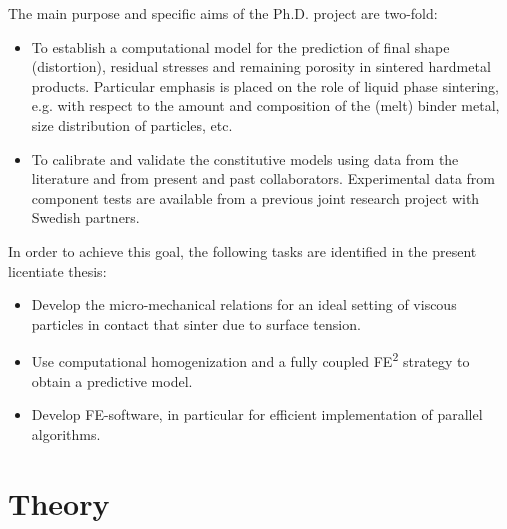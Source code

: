 \documentclass[ExampleMasters.tex]{subfiles}
\begin{document}
The main purpose and specific aims of the Ph.D. project are two-fold:
\begin{itemize}
\item To establish a computational model for the prediction of final shape (distortion), residual stresses and remaining porosity in sintered hardmetal products.
Particular emphasis is placed on the role of liquid phase sintering, e.g. with respect to the amount and composition of the (melt) binder metal, size distribution of particles, etc.

\item To calibrate and validate the constitutive models using data from the literature and from present and past collaborators.
Experimental data from component tests are available from a previous joint research project with Swedish partners.
\end{itemize}
In order to achieve this goal, the following tasks are identified in the present licentiate thesis:
\begin{itemize}
 \item Develop the micro-mechanical relations for an ideal setting of viscous particles in contact that sinter due to surface tension.
 \item Use computational homogenization and a fully coupled FE\textsuperscript{2} strategy to obtain a predictive model.
 \item Develop FE-software, in particular for efficient implementation of parallel algorithms.
\end{itemize}

\chapter{Theory}

\end{document}
